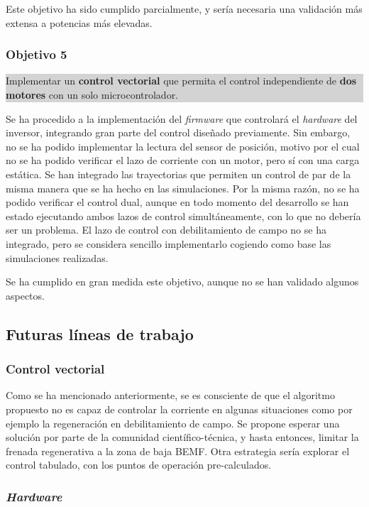 Este objetivo ha sido cumplido parcialmente, y sería necesaria una validación más extensa a potencias más elevadas.

\subsubsection*{Objetivo 5}
\colorbox{lightgray}{%
	\parbox{\dimexpr\linewidth-2\fboxsep-2\fboxrule}{%
		Implementar un \textbf{control vectorial} que permita el control independiente de \textbf{dos motores} con un solo microcontrolador.%
	}%
}

Se ha procedido a la implementación del \textit{firmware} que controlará el \textit{hardware} del inversor, integrando gran parte del control diseñado previamente. Sin embargo, no se ha podido implementar la lectura del sensor de posición, motivo por el cual no se ha podido verificar el lazo de corriente con un motor, pero sí con una carga estática. Se han integrado las trayectorias que permiten un control de par de la misma manera que se ha hecho en las simulaciones. Por la misma razón, no se ha podido verificar el control dual, aunque en todo momento del desarrollo se han estado ejecutando ambos lazos de control simultáneamente, con lo que no debería ser un problema. El lazo de control con debilitamiento de campo no se ha integrado, pero se considera sencillo implementarlo cogiendo como base las simulaciones realizadas. 

Se ha cumplido en gran medida este objetivo, aunque no se han validado algunos aspectos.


\subsection{Futuras líneas de trabajo}

\subsubsection{Control vectorial}

Como se ha mencionado anteriormente, se es consciente de que el algoritmo propuesto no es capaz de controlar la corriente en algunas situaciones como por ejemplo la regeneración en debilitamiento de campo. Se propone esperar una solución por parte de la comunidad científico-técnica, y hasta entonces, limitar la frenada regenerativa a la zona de baja BEMF. Otra estrategia sería explorar el control tabulado, con los puntos de operación pre-calculados.

\subsubsection{\textit{Hardware}}

